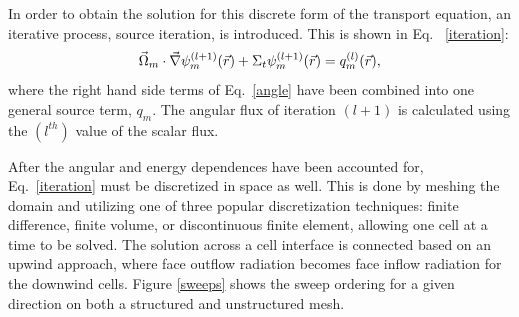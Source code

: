 In order to obtain the solution for this discrete form of the transport equation, an iterative process, source iteration, is introduced. This is shown in Eq. ~\eqref{iteration}:
\begin{equation}
\vec{\Omega}_m \cdot \vec\nabla \psi_m^{(l+1)}(\vec{r}) + \Sigma_t \psi_m^{(l+1)}(\vec{r}) = q_m^{(l)}(\vec{r}),
\label{iteration}
\end{equation}
where the right hand side terms of Eq.~\eqref{angle} have been combined into one general source term, $q_m$. The angular flux of iteration $(l+1)$ is calculated using the $(l^{th})$ value of the scalar flux.

After the angular and energy dependences have been accounted for, Eq.~\eqref{iteration} must be discretized in space as well. This is done by meshing the domain and utilizing one of three popular discretization techniques: finite difference\cite{fd}, finite volume\cite{fd}, or discontinuous finite element\cite{Reed}, allowing one cell at a time to be solved. The solution across a cell interface is connected based on an upwind approach, where face outflow radiation becomes face inflow radiation for the downwind cells. Figure \ref{sweeps} shows the sweep ordering for a given direction on both a structured and unstructured mesh.

